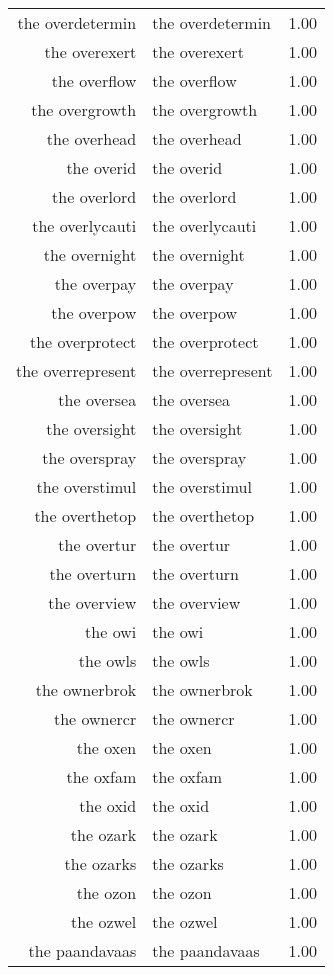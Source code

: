 \begin{table}[ht]
\begin{tabular}{rlr}
  the overdetermin & the overdetermin & 1.00 \\ 
  the overexert & the overexert & 1.00 \\ 
  the overflow & the overflow & 1.00 \\ 
  the overgrowth & the overgrowth & 1.00 \\ 
  the overhead & the overhead & 1.00 \\ 
  the overid & the overid & 1.00 \\ 
  the overlord & the overlord & 1.00 \\ 
  the overlycauti & the overlycauti & 1.00 \\ 
  the overnight & the overnight & 1.00 \\ 
  the overpay & the overpay & 1.00 \\ 
  the overpow & the overpow & 1.00 \\ 
  the overprotect & the overprotect & 1.00 \\ 
  the overrepresent & the overrepresent & 1.00 \\ 
  the oversea & the oversea & 1.00 \\ 
  the oversight & the oversight & 1.00 \\ 
  the overspray & the overspray & 1.00 \\ 
  the overstimul & the overstimul & 1.00 \\ 
  the overthetop & the overthetop & 1.00 \\ 
  the overtur & the overtur & 1.00 \\ 
  the overturn & the overturn & 1.00 \\ 
  the overview & the overview & 1.00 \\ 
  the owi & the owi & 1.00 \\ 
  the owls & the owls & 1.00 \\ 
  the ownerbrok & the ownerbrok & 1.00 \\ 
  the ownercr & the ownercr & 1.00 \\ 
  the oxen & the oxen & 1.00 \\ 
  the oxfam & the oxfam & 1.00 \\ 
  the oxid & the oxid & 1.00 \\ 
  the ozark & the ozark & 1.00 \\ 
  the ozarks & the ozarks & 1.00 \\ 
  the ozon & the ozon & 1.00 \\ 
  the ozwel & the ozwel & 1.00 \\ 
  the paandavaas & the paandavaas & 1.00 \\ 

\end{tabular}
\end{table}
